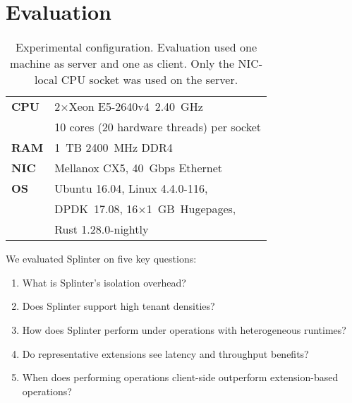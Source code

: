 \section{Evaluation}
\label{sec:evaluation}

\begin{table}[t]
\caption{Experimental configuration. Evaluation used
one machine as server and one as client.
Only the NIC-local CPU socket was used on the server.}
\centering
\begin{tabular}{p{} p{}}
\toprule
\textbf{CPU} & 2$\times$Xeon E5-2640v4~2.40~GHz\\
  & 10 cores (20 hardware threads) per socket
\\
\midrule
\textbf{RAM} & 1~TB 2400~MHz DDR4
\\
\midrule
\textbf{NIC} & Mellanox CX5, 40~Gbps Ethernet
\\
\midrule
\textbf{OS} & Ubuntu 16.04, Linux 4.4.0-116,\\
        & DPDK~17.08, 16$\times$1~GB~Hugepages,\\
        & Rust 1.28.0-nightly
\\
\bottomrule
\end{tabular}
\label{table:setup}
\end{table}

We evaluated Splinter on five key questions:


\begin{enumerate}
\item What is Splinter's isolation overhead?
\item Does Splinter support high tenant densities?
\item How does Splinter perform under operations with heterogeneous runtimes?
\item Do representative extensions see latency and throughput benefits?
\item When does performing operations client-side outperform extension-based operations?
\end{enumerate}

